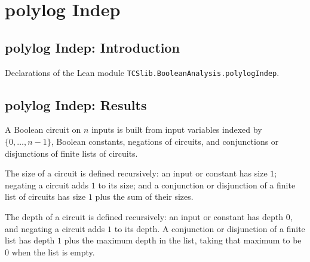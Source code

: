 \section{polylog Indep}
\subsection*{polylog Indep: Introduction}

Declarations of the Lean module \texttt{TCSlib.BooleanAnalysis.polylogIndep}.

\subsection*{polylog Indep: Results}

\begin{definition}
\label{Circuit}
\leanok
A Boolean circuit on $n$ inputs is built from input variables indexed by
$\{0,\ldots,n-1\}$, Boolean constants, negations of circuits, and conjunctions or
disjunctions of finite lists of circuits.
\end{definition}

\begin{definition}
\label{Circuit.size}
\leanok
{}
The size of a circuit is defined recursively: an input or constant has size $1$;
negating a circuit adds $1$ to its size; and a conjunction or disjunction of a finite
list of circuits has size $1$ plus the sum of their sizes.
\end{definition}

\begin{definition}
\label{Circuit.depth}
\leanok
{}
The depth of a circuit is defined recursively: an input or constant has depth $0$, and
negating a circuit adds $1$ to its depth. A conjunction or disjunction of a finite list
has depth $1$ plus the maximum depth in the list, taking that maximum to be $0$ when the
list is empty.
\end{definition}

